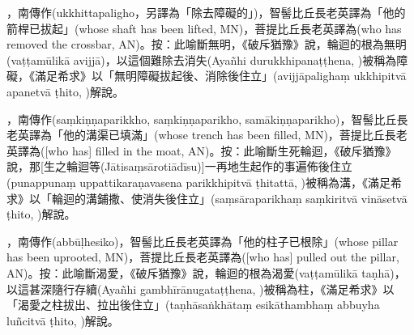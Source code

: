 \startitemgroup[noteitems]
\item{}，南傳作(ukkhittapaligho，另譯為「除去障礙的」)，智髻比丘長老英譯為「他的箭桿已拔起」(whose shaft has been lifted, MN)，菩提比丘長老英譯為(who has removed the crossbar, AN)。按：此喻斷無明，《破斥猶豫》說，輪迴的根為無明(vaṭṭamūlikā avijjā)，以這個難除去消失(Ayañhi durukkhipanaṭṭhena, )被稱為障礙，《滿足希求》以「無明障礙拔起後、消除後住立」(avijjāpalighaṃ ukkhipitvā apanetvā ṭhito, )解說。 
\stopitemgroup

\startitemgroup[noteitems]
\item{}，南傳作(saṃkiṇṇaparikkho, saṃkiṇṇaparikho, samākiṇṇaparikho)，智髻比丘長老英譯為「他的溝渠已填滿」(whose trench has been filled, MN)，菩提比丘長老英譯為([who has] filled in the moat, AN)。按：此喻斷生死輪迴，《破斥猶豫》說，那[生之輪迴等(Jātisaṃsārotiādīsu)]一再地生起作的事遍佈後住立(punappunaṃ uppattikaraṇavasena parikkhipitvā ṭhitattā, )被稱為溝，《滿足希求》以「輪迴的溝鋪撒、使消失後住立」(saṃsāraparikhaṃ saṃkiritvā vināsetvā ṭhito, )解說。
\stopitemgroup

\startitemgroup[noteitems]
\item{}，南傳作(abbūḷhesiko)，智髻比丘長老英譯為「他的柱子已根除」(whose pillar has been uprooted, MN)，菩提比丘長老英譯為([who has] pulled out the pillar, AN)。按：此喻斷渴愛，《破斥猶豫》說，輪迴的根為渴愛(vaṭṭamūlikā taṇhā)，以這甚深隨行存續(Ayañhi gambhīrānugataṭṭhena, )被稱為柱，《滿足希求》以「渴愛之柱拔出、拉出後住立」(taṇhāsaṅkhātaṃ esikāthambhaṃ abbuyha luñcitvā ṭhito, )解說。
\stopitemgroup

